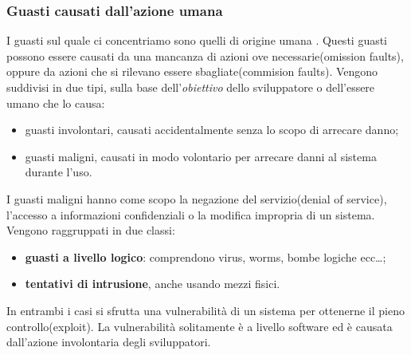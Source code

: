  \subsubsection{Guasti causati dall'azione umana}
 I guasti sul quale ci concentriamo sono quelli di origine umana . Questi guasti possono essere causati da una mancanza di 
 azioni ove necessarie(omission faults), oppure da azioni che si rilevano essere sbagliate(commision faults). Vengono
 suddivisi in due tipi, sulla base dell'\emph{obiettivo} dello sviluppatore o dell'essere umano che lo causa:
 \begin{itemize}
     \item guasti involontari, causati  accidentalmente senza lo scopo di arrecare danno;
     \item guasti maligni, causati in modo volontario per arrecare danni al sistema durante l'uso.
 \end{itemize}
 I guasti maligni hanno  come scopo la negazione del servizio(denial of service), l'accesso a informazioni confidenziali
 o la modifica impropria di un sistema.
 Vengono raggruppati in due classi:
 \begin{itemize}
     \item \textbf{guasti a livello logico}: comprendono virus, worms, bombe logiche ecc\dots;
     \item \textbf{tentativi di intrusione}, anche usando mezzi fisici.
 \end{itemize}
 In entrambi i casi si sfrutta una vulnerabilità di un sistema per ottenerne il pieno controllo(exploit).
 La vulnerabilità solitamente è a livello software ed è causata dall'azione involontaria degli sviluppatori.

